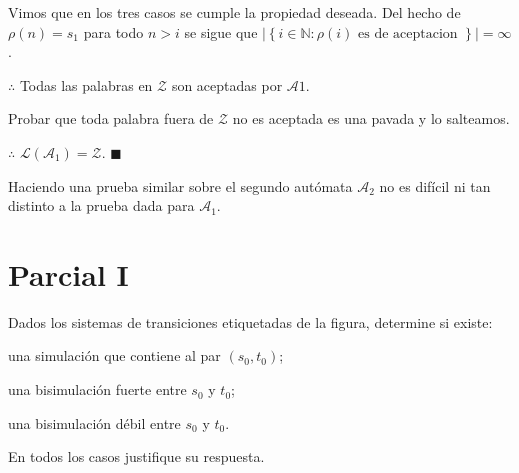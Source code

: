 \documentclass[a4paper, 12pt]{article}
\begin{document}
Vimos que en los tres casos se cumple la propiedad deseada. Del hecho de
$\rho(n) = s_1$ para todo $n > i$ se sigue que $\left| \left\{ i \in \mathbb{N}
: \rho(i) \text{ es de aceptacion }\right\}  \right| = \infty$.

$\therefore $ Todas las palabras en $\mathcal{Z}$ son aceptadas por
$\mathcal{A}1$.

Probar que toda palabra fuera de $\mathcal{Z}$ no es aceptada es una pavada y lo
salteamos. 

$\therefore $ $\mathcal{L}(\mathcal{A}_1) = \mathcal{Z}$. $\blacksquare$

Haciendo una prueba similar sobre el segundo autómata $\mathcal{A}_2$ no es
difícil ni tan distinto a la prueba dada para $\mathcal{A}_1$.


\pagebreak 

\section*{Parcial I}

\begin{myframe}
    Dados los sistemas de transiciones etiquetadas de la figura, determine si existe:
    \item[(a)] una simulación que contiene al par $(s_0,t_0)$;
    \item[(b)] una bisimulación fuerte entre $s_0$ y $t_0$;
    \item[(c)] una bisimulación débil entre $s_0$ y $t_0$.

En todos los casos justifique su respuesta.
\end{myframe}
\end{document}
